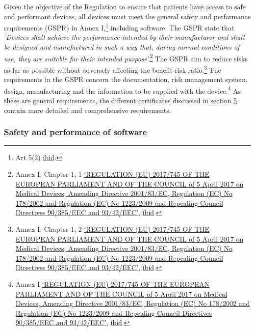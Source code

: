 \documentclass[
]{scrartcl}
\begin{document}
Given the objective of the Regulation to ensure that patients have access to safe and performant devices, all devices must meet the general safety and performance requirements (GSPR) in Annex I,\footnote{Art 5(2) \protect\hyperlink{ref-REGULATIONEU2017a}{ibid}.} including software. The GSPR state that \emph{'Devices shall achieve the performance intended by their manufacturer and shall be designed and manufactured in such a way that, during normal conditions of use, they are suitable for their intended purpose}'.\footnote{Annex I, Chapter 1, 1 \protect\hyperlink{ref-REGULATIONEU2017a}{{`{REGULATION} ({EU}) 2017/745 {OF THE EUROPEAN PARLIAMENT AND OF THE COUNCIL} of 5 {April} 2017 on Medical Devices, Amending {Directive} 2001/83/{EC}, {Regulation} ({EC}) {No} 178/2002 and {Regulation} ({EC}) {No} 1223/2009 and Repealing {Council Directives} 90/385/{EEC} and 93/42/{EEC}'}}, \protect\hyperlink{ref-REGULATIONEU2017a}{ibid}.} The GSPR aim to reduce risks as far as possible without adversely affecting the benefit-risk ratio.\footnote{Annex I, Chapter 1, 2 \protect\hyperlink{ref-REGULATIONEU2017a}{{`{REGULATION} ({EU}) 2017/745 {OF THE EUROPEAN PARLIAMENT AND OF THE COUNCIL} of 5 {April} 2017 on Medical Devices, Amending {Directive} 2001/83/{EC}, {Regulation} ({EC}) {No} 178/2002 and {Regulation} ({EC}) {No} 1223/2009 and Repealing {Council Directives} 90/385/{EEC} and 93/42/{EEC}'}}, \protect\hyperlink{ref-REGULATIONEU2017a}{ibid}.} The requirements in the GSPR concern the documentation, risk management system, design, manufacturing and the information to be supplied with the device.\footnote{Annex I \protect\hyperlink{ref-REGULATIONEU2017a}{{`{REGULATION} ({EU}) 2017/745 {OF THE EUROPEAN PARLIAMENT AND OF THE COUNCIL} of 5 {April} 2017 on Medical Devices, Amending {Directive} 2001/83/{EC}, {Regulation} ({EC}) {No} 178/2002 and {Regulation} ({EC}) {No} 1223/2009 and Repealing {Council Directives} 90/385/{EEC} and 93/42/{EEC}'}}, \protect\hyperlink{ref-REGULATIONEU2017a}{ibid}.} As these are general requirements, the different certificates discussed in section \protect\hyperlink{sec:Certificates-in-the}{5} contain more detailed and comprehensive requirements.

\hypertarget{safety-and-performance-of-software}{%
\subsubsection{Safety and performance of software}\label{safety-and-performance-of-software}}
\end{document}
